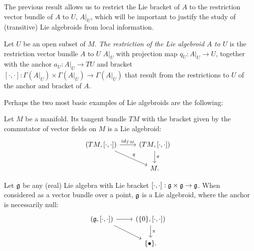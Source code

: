 The previous result allows us to restrict the Lie bracket of $A$ to the restriction vector bundle of $A$ to $U$, $A|_U$, which will be important to justify the study of (transitive) Lie algebroids from local information. 

\begin{definition}%
Let $U$ be an open subset of $M$. \emph{The restriction of the Lie algebroid $A$ to $U$} is the restriction vector bundle $A$ to $U$ $A|_U$ with projection map $q_U: A|_U \to U$, together with the anchor $a_U:A|_U \to TU$ and bracket $[\cdot , \cdot]:\Gamma(A|_U)\times \Gamma(A|_U) \to \Gamma(A|_U)$ that result from the restrictions to $U$ of the anchor and bracket of $A$.
\end{definition}

\linea 

Perhaps the two most basic examples of Lie algebroids are the following:
\begin{example} \label{exampleTMIsAlgebroid}
Let $M$ be a manifold. Its tangent bundle $TM$ with the bracket given by the commutator of vector fields on $M$ is a Lie algebroid:
\begin{equation*}
    \begin{tikzcd}
    (TM, [\cdot, \cdot]) \arrow{r}{id_{TM}} \arrow{dr}{q} & (TM, [\cdot, \cdot]) \arrow{d}{\pi}\\
    & M.
    \end{tikzcd}
\end{equation*}
\end{example}

\begin{example}\label{exampleLieAlgebraIsAlgebroid}
Let $\mathfrak{g}$ be any (real) Lie algebra with Lie bracket $[\cdot, \cdot]: \mathfrak{g} \times \mathfrak{g} \to \mathfrak{g}$. When considered as a vector bundle over a point, $\mathfrak{g}$ is a Lie algebroid, where the anchor is necessarily null:
\begin{equation*}
    \begin{tikzcd}
    (\alg g, [\cdot, \cdot]) \arrow{r} \arrow{dr} & (\{0\}, [\cdot, \cdot]) \arrow{d}{\pi}\\
    & \{\bullet\}.
    \end{tikzcd}
\end{equation*}
\end{example}

